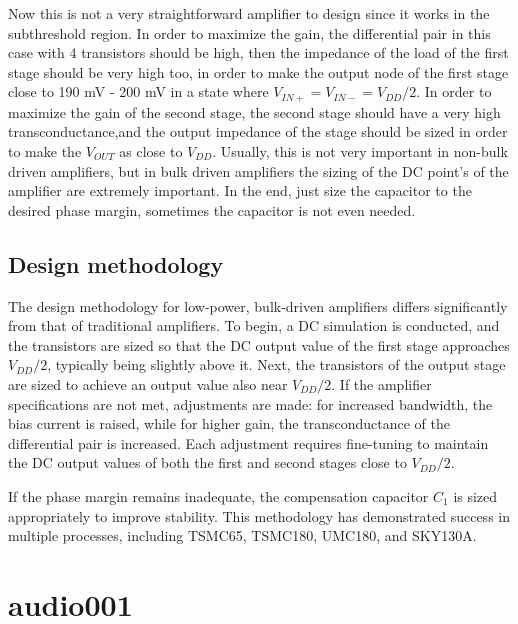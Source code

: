 \documentclass[12pt]{article}
\begin{document}
Now this is not a very straightforward amplifier to design since it works in the subthreshold region.
In order to maximize the gain, the differential pair in this case with 4 transistors should be high, then the impedance of the load of the first stage should be very high too, in order to make the output node of the first stage close to 190 mV - 200 mV in a state where $V_{IN+} = V_{IN-} = V_{DD}/2$. In order to maximize the gain of the second stage, the second stage should have a very high transconductance,and the output impedance of the stage should be sized in order to make the $V_{OUT}$ as close to $V_{DD}$. Usually, this is not very important in non-bulk driven amplifiers, but in bulk driven amplifiers the sizing of the DC point's of the amplifier are extremely important. In the end, just size the capacitor to the desired phase margin, sometimes the capacitor is not even needed.

\subsection{Design methodology}

The design methodology for low-power, bulk-driven amplifiers differs significantly from that of traditional amplifiers. To begin, a DC simulation is conducted, and the transistors are sized so that the DC output value of the first stage approaches \( V_{DD}/2 \), typically being slightly above it. Next, the transistors of the output stage are sized to achieve an output value also near \( V_{DD}/2 \). If the amplifier specifications are not met, adjustments are made: for increased bandwidth, the bias current is raised, while for higher gain, the transconductance of the differential pair is increased. Each adjustment requires fine-tuning to maintain the DC output values of both the first and second stages close to \( V_{DD}/2 \).

If the phase margin remains inadequate, the compensation capacitor \( C_1 \) is sized appropriately to improve stability. This methodology has demonstrated success in multiple processes, including TSMC65, TSMC180, UMC180, and SKY130A.








\newpage

\section{audio001}
\end{document}
